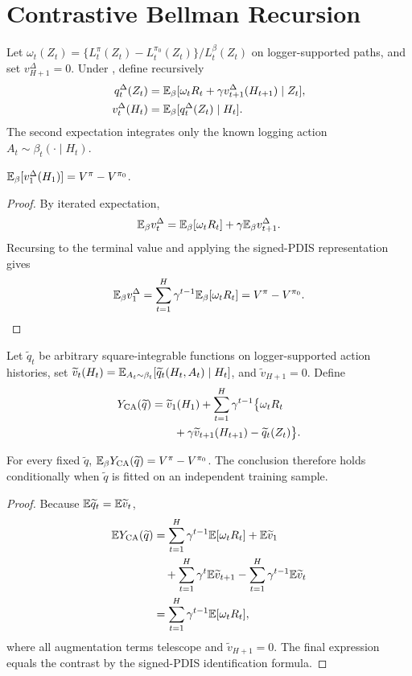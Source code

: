 \section{Contrastive Bellman Recursion}

Let
$\omega_t(Z_t)=\{L_t^\pi(Z_t)-L_t^{\pi_0}(Z_t)\}/L_t^\beta(Z_t)$
on logger-supported paths, and set $v_{H+1}^\Delta=0$. Under \UCC, define recursively
\begin{align}
q_t^\Delta(Z_t)
&=\mathbb{E}_\beta[\omega_tR_t+\gamma v_{t+1}^\Delta(H_{t+1})\mid Z_t],
\label{eq:suppq}\\
v_t^\Delta(H_t)
&=\mathbb{E}_\beta[q_t^\Delta(Z_t)\mid H_t].
\label{eq:suppv}
\end{align}
The second expectation integrates only the known logging action $A_t\sim\beta_t(\cdot\mid H_t)$.

\begin{lemma}
\label{lem:recursion}
$\mathbb{E}_\beta[v_1^\Delta(H_1)]=V^\pi-V^{\pi_0}$.
\end{lemma}
\begin{proof}
By iterated expectation,
\[
\mathbb{E}_\beta v_t^\Delta
=\mathbb{E}_\beta[\omega_tR_t]+\gamma\mathbb{E}_\beta v_{t+1}^\Delta.
\]
Recursing to the terminal value and applying the signed-PDIS representation gives
\[
\mathbb{E}_\beta v_1^\Delta
=\sum_{t=1}^H\gamma^{t-1}\mathbb{E}_\beta[\omega_tR_t]
=V^\pi-V^{\pi_0}.
\]
\end{proof}

Let $\widetilde q_t$ be arbitrary square-integrable functions on logger-supported action histories, set
$\widetilde v_t(H_t)=\mathbb{E}_{A_t\sim\beta_t}[\widetilde q_t(H_t,A_t)\mid H_t]$,
and $\widetilde v_{H+1}=0$. Define
\[
\begin{aligned}
Y_{\rm CA}(\widetilde q)
&=\widetilde v_1(H_1)+\sum_{t=1}^H\gamma^{t-1}\bigl\{\omega_tR_t\\
&\qquad+\gamma\widetilde v_{t+1}(H_{t+1})-\widetilde q_t(Z_t)\bigr\}.
\end{aligned}
\]

\begin{proposition}
\label{prop:modelrobust}
For every fixed $\widetilde q$,
$\mathbb{E}_\beta Y_{\rm CA}(\widetilde q)=V^\pi-V^{\pi_0}$.
The conclusion therefore holds conditionally when $\widetilde q$ is fitted on an independent training sample.
\end{proposition}
\begin{proof}
Because $\mathbb{E}\widetilde q_t=\mathbb{E}\widetilde v_t$,
\begin{align*}
\mathbb{E} Y_{\rm CA}(\widetilde q)
&=\sum_{t=1}^H\gamma^{t-1}\mathbb{E}[\omega_tR_t]
+\mathbb{E}\widetilde v_1\\
&\quad+\sum_{t=1}^H\gamma^t\mathbb{E}\widetilde v_{t+1}
-\sum_{t=1}^H\gamma^{t-1}\mathbb{E}\widetilde v_t\\
&=\sum_{t=1}^H\gamma^{t-1}\mathbb{E}[\omega_tR_t],
\end{align*}
where all augmentation terms telescope and $\widetilde v_{H+1}=0$. The final expression equals the contrast by the signed-PDIS identification formula.
\end{proof}

